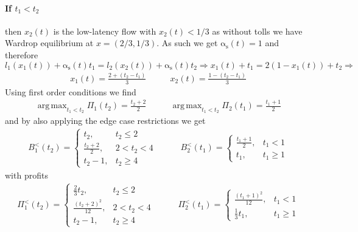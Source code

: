 \documentclass[10pt,a4paper]{book}
\newcommand{\as}{\mathrm{\alpha_s}}
\DeclareMathOperator*{\argmax}{arg\,max}
\theoremstyle{definition}
\theoremstyle{comment}
\begin{document}
\paragraph{If $t_1 < t_2$} then $x_2(t)$ is the low-latency flow with $x_2(t) < 1/3$ as without tolls we have Wardrop equilibrium at $x = (2/3, 1/3)$.
As such we get $\as(t) = 1$ and therefore
\[
	l_1(x_1(t)) + \as(t) t_1 = l_2(x_2(t)) + \as(t) t_2 \Rightarrow	x_1(t) + t_1 = 2 (1 - x_1(t)) + t_2 \Rightarrow
\]
\begin{equation*}
	\begin{aligned}
		x_1(t) = \frac{2 + (t_2 - t_1)}3
	\end{aligned}
	\qquad
	\begin{aligned}
		x_2(t) = \frac{1 - (t_2 - t_1)}3
	\end{aligned}
\end{equation*}
Using first order conditions we find
\begin{equation*}
	\begin{aligned}
		\argmax_{t_1 < t_2}\Pi_1(t_2) = \frac{t_2 + 2}2
	\end{aligned}
	\qquad
	\begin{aligned}
		\argmax_{t_1 < t_2}\Pi_2(t_1) = \frac{t_1 + 1}2
	\end{aligned}
\end{equation*}
and by also applying the edge case restrictions we get
\begin{equation*}
	\begin{aligned}
		B_1^<(t_2) =
		\begin{cases}
			t_2, & t_2 \le 2 \\
			\frac{t_2 + 2}2, & 2 < t_2 < 4 \\
			t_2 - 1, & t_2 \ge 4
		\end{cases}
	\end{aligned}
	\qquad
	\begin{aligned}
		B_2^<(t_1) =
		\begin{cases}
			\frac{t_1 + 1}2, & t_1 < 1 \\
			t_1, & t_1 \ge 1
		\end{cases}
	\end{aligned}
\end{equation*}
with profits
\begin{equation*}
	\begin{aligned}
		\Pi_1^<(t_2) =
		\begin{cases}
			\frac23 t_2, & t_2 \le 2 \\
			\frac{(t_2 + 2)^2}{12}, & 2 < t_2 < 4 \\
			t_2 - 1, & t_2 \ge 4
		\end{cases}
	\end{aligned}
	\qquad
	\begin{aligned}
		\Pi_2^<(t_1) =
		\begin{cases}
			\frac{(t_1 + 1)^2}{12}, & t_1 < 1 \\
			\frac13 t_1, & t_1 \ge 1
		\end{cases}
	\end{aligned}
\end{equation*}
\end{document}

